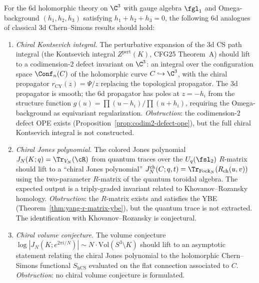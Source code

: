 \begin{conjecture}
\label{conj:cfg25-adversarial}
\ClaimStatusConjectured
For the 6d holomorphic theory on $\C^3$ with gauge algebra $\fgl_1$ and Omega-background $(h_1, h_2, h_3)$ satisfying $h_1 + h_2 + h_3 = 0$, the following 6d analogues of classical 3d Chern--Simons results should hold:
\begin{enumerate}[label=\textup{(\roman*)}]
 \item \emph{Chiral Kontsevich integral.}
 The perturbative expansion of the 3d CS path integral (the Kontsevich integral $Z^{\mathrm{pert}}(K)$, CFG25 Theorem~A) should lift to a codimension-$2$ defect invariant on $\C^3$: an integral over the configuration space $\Conf_n(C)$ of the holomorphic curve $C \hookrightarrow \C^3$, with the chiral propagator $r_{\mathrm{CY}}(z) = \Psi/z$ replacing the topological propagator. The 3d propagator is smooth; the 6d propagator has poles at $z = -h_i$ from the structure function $g(u) = \prod(u - h_i)/\prod(u + h_i)$, requiring the Omega-background as equivariant regularization.
 \emph{Obstruction}: the codimension-$2$ defect OPE exists (Proposition~\ref{prop:codim2-defect-ope}), but the full chiral Kontsevich integral is not constructed.

 \item \emph{Chiral Jones polynomial.}
 The colored Jones polynomial $J_N(K; q) = \Tr_{V_N}(\cR)$ from quantum traces over the $U_q(\fsl_2)$ $R$-matrix should lift to a ``chiral Jones polynomial'' $J^{\mathrm{ch}}_N(C; q, t) = \Tr_{\mathrm{Fock}_N}(R_{\mathrm{ch}}(u, v))$ using the two-parameter $R$-matrix of the quantum toroidal algebra. The expected output is a triply-graded invariant related to Khovanov--Rozansky homology.
 \emph{Obstruction}: the $R$-matrix exists and satisfies the YBE (Theorem~\ref{thm:yang-r-matrix-ybe}), but the quantum trace is not extracted. The identification with Khovanov--Rozansky is conjectural.

 \item \emph{Chiral volume conjecture.}
 The volume conjecture $\log|J_N(K; e^{2\pi i/N})| \sim N \cdot \mathrm{Vol}(S^3 \setminus K)$ should lift to an asymptotic statement relating the chiral Jones polynomial to the holomorphic Chern--Simons functional $S_{\mathrm{hCS}}$ evaluated on the flat connection associated to $C$.
 \emph{Obstruction}: no chiral volume conjecture is formulated.


\end{enumerate}
\end{conjecture}
